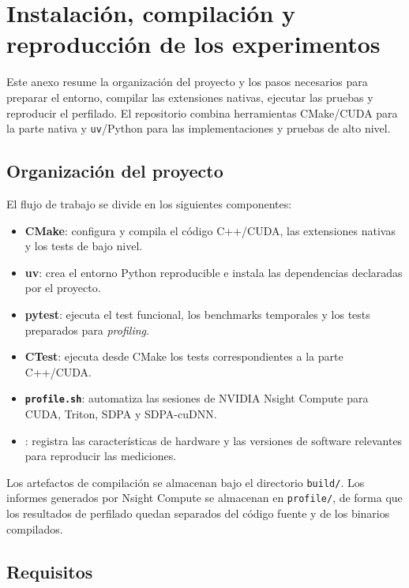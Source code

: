 \chapter{Instalación, compilación y reproducción de los experimentos}\label{anexo_instalacion}

Este anexo resume la organización del proyecto y los pasos necesarios para preparar el entorno, compilar las extensiones nativas, ejecutar las pruebas y reproducir el perfilado. El repositorio combina herramientas CMake/CUDA para la parte nativa y \texttt{uv}/Python para las implementaciones y pruebas de alto nivel.

\section{Organización del proyecto}

El flujo de trabajo se divide en los siguientes componentes:

\begin{itemize}
    \item \textbf{CMake}: configura y compila el código C++/CUDA, las extensiones nativas y los tests de bajo nivel.
    \item \textbf{uv}: crea el entorno Python reproducible e instala las dependencias declaradas por el proyecto.
    \item \textbf{pytest}: ejecuta el test funcional, los benchmarks temporales y los tests preparados para \textit{profiling}.
    \item \textbf{CTest}: ejecuta desde CMake los tests correspondientes a la parte C++/CUDA.
    \item \textbf{\texttt{profile.sh}}: automatiza las sesiones de NVIDIA Nsight Compute para CUDA, Triton, SDPA y SDPA-cuDNN.
    \item \textbf{}: registra las características de hardware y las versiones de software relevantes para reproducir las mediciones.
\end{itemize}

Los artefactos de compilación se almacenan bajo el directorio \texttt{build/}. Los informes generados por Nsight Compute se almacenan en \texttt{profile/}, de forma que los resultados de perfilado quedan separados del código fuente y de los binarios compilados.

\section{Requisitos}

